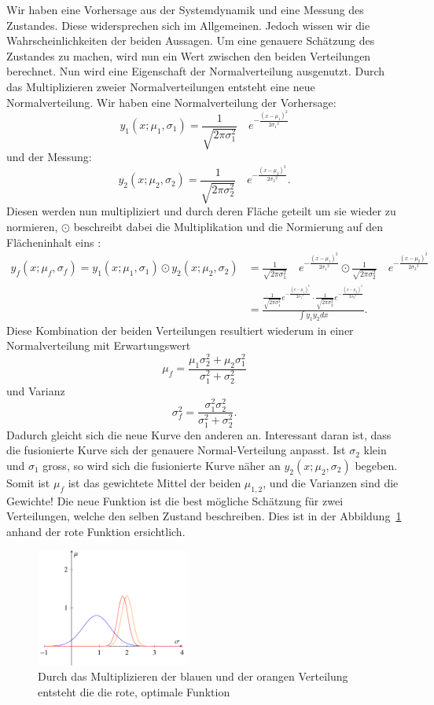 Wir haben eine Vorhersage aus der Systemdynamik und eine Messung des Zustandes.
Diese widersprechen sich im Allgemeinen. 
Jedoch wissen wir die Wahrscheinlichkeiten der beiden Aussagen. 
Um eine genauere Schätzung des Zustandes zu machen, wird nun ein Wert zwischen den beiden Verteilungen berechnet. 
Nun wird eine Eigenschaft der Normalverteilung ausgenutzt. Durch das Multiplizieren zweier Normalverteilungen entsteht eine neue Normalverteilung. 
Wir haben eine Normalverteilung der Vorhersage:
\[ 
{y_1}(x;{\mu_1},{\sigma_1})=\frac{1}{\sqrt{2\pi\sigma_1^2}}\quad e^{-\frac{(x-{\mu_1})^2}{2{\sigma_1}^2}} 
\]
und der Messung:
\[ 
{y_2}(x;{\mu_2},{\sigma_2})=\frac{1}{\sqrt{2\pi\sigma_2^2}}\quad e^{-\frac{(x-{\mu_2})^2}{2{\sigma_2}^2}}.
\]
Diesen werden nun multipliziert und durch deren Fläche geteilt um sie wieder zu normieren, $\odot$ beschreibt dabei die Multiplikation und die Normierung auf den Flächeninhalt eins :
\begin{align*}
	{y_f}(x; {\mu_f}, {\sigma_f}) = {y_1}(x;{ \mu_1},{ \sigma_1}) \odot {y_2}(x; {\mu_2}, {\sigma_2})
	&=
	\frac{1}{\sqrt{2\pi\sigma_1^2}}\quad e^{-\frac{(x-{\mu_1})^2}{2{\sigma_1}^2}} \odot \frac{1}{\sqrt{2\pi\sigma_2^2}}\quad e^{-\frac{(x-{\mu_2})^2}{2{\sigma_2}^2}}
	\\
	&=
	\frac{ \frac{1}{\sqrt{2\pi\sigma_1^2}}e^{-\frac{(x-{\mu_1})^2}{2{\sigma_1}^2}} \cdot \frac{1}{\sqrt{2\pi\sigma_2^2}}e^{-\frac{(x-{\mu_2})^2}{2{\sigma_2}^2}}}{\int {y_1} {y_2} dx}.
\end{align*}
Diese Kombination der beiden Verteilungen resultiert wiederum in einer Normalverteilung
mit Erwartungswert
\[ \mu_f = \frac{\mu_1\sigma_2^2 + \mu_2 \sigma_1^2}{\sigma_1^2 + \sigma_2^2} \]
und Varianz
\[
\sigma_f^2 = \frac{\sigma_1^2 \sigma_2^2}{\sigma_1^2 + \sigma_2^2}.
\]
Dadurch gleicht sich die neue Kurve den anderen an. Interessant daran ist, dass die fusionierte Kurve sich der genauere Normal-Verteilung anpasst.
Ist ${\sigma_2}$ klein und ${\sigma_1}$ gross, so wird sich die fusionierte Kurve näher an ${y_2}(x;{\mu_2},{\sigma_2})$ begeben.
Somit ist $\mu_f$ ist das gewichtete Mittel der beiden $\mu_{1,2}$, und die Varianzen sind die Gewichte!
Die neue Funktion ist die best mögliche Schätzung für zwei Verteilungen, welche den selben Zustand beschreiben. 
Dies ist in der Abbildung~\ref{erdbeben:Gauss3} anhand der rote Funktion ersichtlich. 
\begin{figure}
 \begin{center}
 \includegraphics[width=5cm]{papers/erdbeben/Gausskurve3.pdf}
 \caption{Durch das Multiplizieren der blauen und der orangen Verteilung entsteht die die rote, optimale Funktion}
 \label{erdbeben:Gauss3}
 \end{center}
\end{figure}
